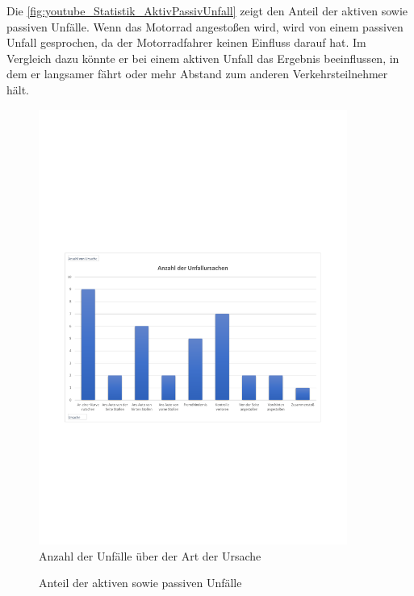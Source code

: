 Die \autoref{fig:youtube_Statistik_AktivPassivUnfall} zeigt den Anteil der aktiven sowie passiven Unfälle. Wenn das Motorrad angestoßen wird, wird von einem passiven Unfall gesprochen, da der Motorradfahrer keinen Einfluss darauf hat. Im Vergleich dazu könnte er bei einem aktiven Unfall das Ergebnis beeinflussen, in dem er langsamer fährt oder mehr Abstand zum anderen Verkehrsteilnehmer hält.

\begin{figure}[htpb]
	\centering
	\includegraphics[width=0.9\textwidth]{Bilder/youtube_Statistik_AnzahlUnfallUrsachen.pdf}
	\caption{Anzahl der Unfälle über der Art der Ursache}
	\label{fig:youtube_Statistik_AnzahlUnfallUrsachen}
\end{figure}
\begin{figure}[htpb]
	\centering
	\caption{Anteil der aktiven sowie passiven Unfälle}
	\label{fig:youtube_Statistik_AktivPassivUnfall}
\end{figure}





